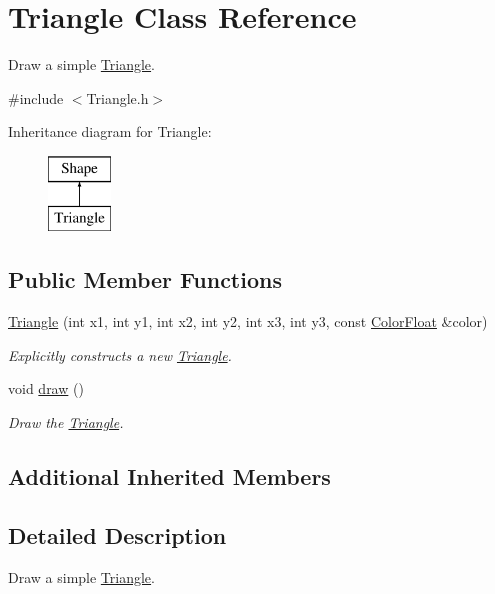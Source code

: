 \hypertarget{class_triangle}{\section{Triangle Class Reference}
\label{class_triangle}
}


Draw a simple \hyperlink{class_triangle}{Triangle}.  




{\ttfamily \#include $<$Triangle.\+h$>$}

Inheritance diagram for Triangle\+:\begin{figure}[H]
\begin{center}
\leavevmode
\includegraphics[height=2.000000cm]{class_triangle}
\end{center}
\end{figure}
\subsection*{Public Member Functions}
\begin{DoxyCompactItemize}
\item 
\hyperlink{class_triangle_a22609a1523399fd46fa3751afe692a1d}{Triangle} (int x1, int y1, int x2, int y2, int x3, int y3, const \hyperlink{struct_color_float}{Color\+Float} \&color)
\begin{DoxyCompactList}\small\item\em Explicitly constructs a new \hyperlink{class_triangle}{Triangle}. \end{DoxyCompactList}\item 
void \hyperlink{class_triangle_a43067ba4ee3c1d56930a567cc2186624}{draw} ()
\begin{DoxyCompactList}\small\item\em Draw the \hyperlink{class_triangle}{Triangle}. \end{DoxyCompactList}\end{DoxyCompactItemize}
\subsection*{Additional Inherited Members}


\subsection{Detailed Description}
Draw a simple \hyperlink{class_triangle}{Triangle}. 

